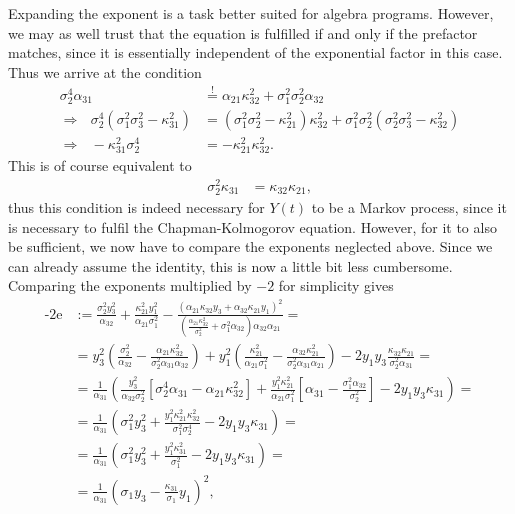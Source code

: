 \documentclass[english, parskip=full]{scrartcl}
\newcommand{\kla}{}
\newcommand{\klam}{}
\newcommand{\tecxt}{}
\begin{document}
Expanding the exponent is a task better suited for algebra programs.
However, we may as well trust that the equation is fulfilled if and only if the prefactor matches, since it is essentially independent of the exponential factor in this case.
Thus we arrive at the condition
\begin{align}
\sigma_2^4\alpha_{31} &\overset{!}{=} \alpha_{21}\kappa_{32}^2 + \sigma_1^2\sigma_2^2\alpha_{32}\\
\Rightarrow\ \ \ \sigma_2^4\kla\left( \sigma_1^2\sigma_3^2 - \kappa_{31}^2 \right) &= \kla\left( \sigma_1^2\sigma_2^2 - \kappa_{21}^2 \right)\kappa_{32}^2 + \sigma_1^2\sigma_2^2\kla\left( \sigma_2^2\sigma_3^2 - \kappa_{32}^2 \right) \\
\Rightarrow\ \ \ -\kappa_{31}^2\sigma_2^4 &= -\kappa_{21}^2\kappa_{32}^2.
\end{align}
This is of course equivalent to
\begin{align}
\sigma_2^2 \kappa_{31} &= \kappa_{32}\kappa_{21} \label{eqn:condition gauss markov} ,
\end{align}
thus this condition is indeed necessary for $Y(t)$ to be a Markov process, since it is necessary to fulfil the Chapman-Kolmogorov equation.
However, for it to also be sufficient, we now have to compare the exponents neglected above.
Since we can already assume the identity, this is now a little bit less cumbersome.
Comparing the exponents multiplied by $-2$ for simplicity gives
\begin{align}
\tecxt\text{-2e} &:= \frac{\sigma_2^2y_3^2}{\alpha_{32}} + \frac{\kappa_{21}^2y_1^2}{\alpha_{21}\sigma_1^2} - \frac{\kla\left( \alpha_{21}\kappa_{32}y_3 + \alpha_{32}\kappa_{21}y_1 \right)^2}{\kla\left( \frac{\alpha_{21}\kappa_{32}^2}{\sigma_2^2} + \sigma_1^2\alpha_{32} \right)\alpha_{32}\alpha_{21}} = \\
&= y_3^2\kla\left( \frac{\sigma_2^2}{\alpha_{32}} - \frac{\alpha_{21}\kappa_{32}^2}{\sigma_2^2\alpha_{31}\alpha_{32}} \right) + y_1^2\kla\left( \frac{\kappa_{21}^2}{\alpha_{21}\sigma_1^2} - \frac{\alpha_{32}\kappa_{21}^2}{\sigma_2^2\alpha_{31}\alpha_{21}} \right) - 2y_1y_3\frac{ \kappa_{32}\kappa_{21} }{\sigma_2^2\alpha_{31}} = \\
&= \frac{1}{\alpha_{31}}\kla\left( \frac{y_3^2}{\alpha_{32}\sigma_2^2}\klam\left[ \sigma_2^4\alpha_{31} - \alpha_{21}\kappa_{32}^2 \right] + \frac{y_1^2\kappa_{21}^2}{\alpha_{21}\sigma_1^2}\klam\left[ \alpha_{31} - \frac{\sigma_1^2\alpha_{32}}{\sigma_2^2} \right] - 2y_1y_3\kappa_{31} \right) = \\
&= \frac{1}{\alpha_{31}}\kla\left( \sigma_1^2y_3^2 + \frac{y_1^2\kappa_{21}^2\kappa_{32}^2}{\sigma_1^2\sigma_2^4} - 2y_1y_3\kappa_{31} \right) = \\
&= \frac{1}{\alpha_{31}}\kla\left( \sigma_1^2y_3^2 + \frac{y_1^2\kappa_{31}^2}{\sigma_1^2} - 2y_1y_3\kappa_{31} \right) = \\
&= \frac{1}{\alpha_{31}}\kla\left( \sigma_1y_3-\frac{\kappa_{31}}{\sigma_1}y_1 \right)^2,
\end{align}
\end{document}
